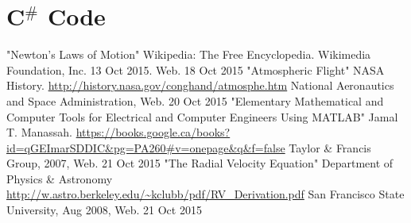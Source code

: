 \documentclass[12pt]{extarticle}
\begin{document}
\section{C$^{\#}$ Code}

\newpage
\begin{thebibliography}{99}

"Newton's Laws of Motion" Wikipedia: The Free Encyclopedia. Wikimedia Foundation, Inc. 13 Oct 2015. Web. 18 Oct 2015
"Atmospheric Flight" NASA History. \url{http://history.nasa.gov/conghand/atmosphe.htm} National Aeronautics and Space Administration, Web. 20 Oct 2015
"Elementary Mathematical and Computer Tools for Electrical and Computer Engineers Using MATLAB" Jamal T. Manassah. \url{https://books.google.ca/books?id=qGEImarSDDIC&pg=PA260#v=onepage&q&f=false} Taylor \& Francis Group, 2007, Web. 21 Oct 2015
"The Radial Velocity Equation" Department of Physics \& Astronomy \url{http://w.astro.berkeley.edu/~kclubb/pdf/RV_Derivation.pdf} San Francisco State University, Aug 2008, Web. 21 Oct 2015

\end{thebibliography}
\end{document}
